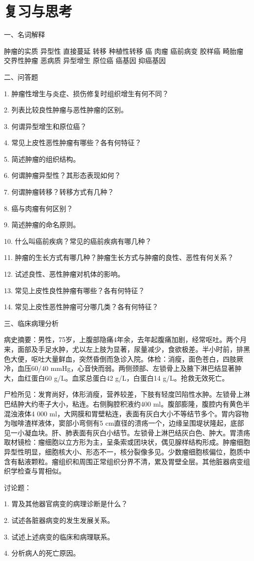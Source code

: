 \section*{复习与思考}

{一、名词解释}

肿瘤的实质 异型性 直接蔓延 转移 种植性转移 癌 肉瘤 癌前病变 胶样癌
畸胎瘤 交界性肿瘤 恶病质 异型增生 原位癌 癌基因 抑癌基因

{二、问答题}

1. 肿瘤性增生与炎症、损伤修复时组织增生有何不同？

2. 列表比较良性肿瘤与恶性肿瘤的区别。

3. 何谓异型增生和原位癌？

4. 常见上皮性恶性肿瘤有哪些？各有何特征？

5. 简述肿瘤的组织结构。

6. 何谓肿瘤异型性？其形态表现如何？

7. 何谓肿瘤转移？转移方式有几种？

8. 癌与肉瘤有何区别？

9. 简述肿瘤的命名原则。

10. 什么叫癌前疾病？常见的癌前疾病有哪几种？

11. 肿瘤的生长方式有哪几种？肿瘤生长方式与肿瘤的良性、恶性有何关系？

12. 试述良性、恶性肿瘤对机体的影响。

13. 常见上皮性良性肿瘤有哪些？各有何特征？

14. 常见上皮性恶性肿瘤可分哪几类？各有何特征？

{三、临床病理分析}

病史摘要：男性，75岁，上腹部隐痛4年余，去年起腹痛加剧，经常呕吐。两个月来，面部及手足水肿，尤以左上肢为显著，尿量减少，食欲极差。半小时前，排黑色大便，呕吐大量鲜血，突然昏倒而急诊入院。体检：消瘦，面色苍白，四肢厥冷，血压60/40
mmHg，心音快而弱。两侧颈部、左锁骨上及腋下淋巴结显著肿大，血红蛋白60
g/L。血浆总蛋白42 g/L，白蛋白14 g/L。抢救无效死亡。

尸检所见：发育尚好，体形消瘦，营养较差，下肢有轻度凹陷性水肿。左锁骨上淋巴结肿大约枣子大小，粘连。右侧胸腔积液约400
ml。腹部膨隆，腹腔内有黄色半混浊液体4 000
ml，大网膜和胃壁粘连，表面有灰白大小不等结节多个。胃内容物为咖啡渣样液体，窦部小弯侧有5
cm直径的溃疡一个，边缘呈围堤状隆起，底部见一小凝血块。肝、肺表面有灰白小结节。左锁骨上淋巴结灰白色、肿大。胃溃疡取材镜检：瘤细胞以立方形为主，呈条索或团块状，偶见腺样结构形成。肿瘤细胞异型性明显，细胞核大小、形态不一，核分裂像多见。少数瘤细胞核偏位，胞质中含有黏液颗粒。瘤组织和周围正常组织分界不清，累及胃壁全层。其他脏器病变组织学检查与胃相似。

讨论题：

1. 胃及其他器官病变的病理诊断是什么？

2. 试述各脏器病变的发生发展关系。

3. 试述上述病变的临床和病理联系。

4. 分析病人的死亡原因。




